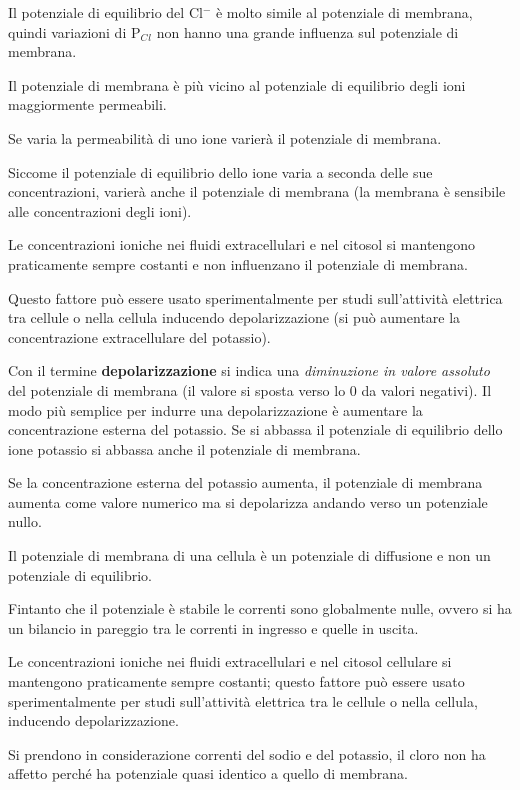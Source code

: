 \documentclass[]{article}
\begin{document}
Il potenziale di equilibrio del Cl\(^-\) è molto simile al potenziale di
membrana, quindi variazioni di P\(_C\)\(_l\) non hanno una grande
influenza sul potenziale di membrana.

Il potenziale di membrana è più vicino al potenziale di equilibrio degli
ioni maggiormente permeabili.

Se varia la permeabilità di uno ione varierà il potenziale di membrana.

Siccome il potenziale di equilibrio dello ione varia a seconda delle sue
concentrazioni, varierà anche il potenziale di membrana (la membrana è
sensibile alle concentrazioni degli ioni).

Le concentrazioni ioniche nei fluidi extracellulari e nel citosol si
mantengono praticamente sempre costanti e non influenzano il potenziale
di membrana.

Questo fattore può essere usato sperimentalmente per studi sull'attività
elettrica tra cellule o nella cellula inducendo depolarizzazione (si può
aumentare la concentrazione extracellulare del potassio).

Con il termine \textbf{depolarizzazione} si indica una \emph{diminuzione
in valore assoluto} del potenziale di membrana (il valore si sposta
verso lo 0 da valori negativi). Il modo più semplice per indurre una
depolarizzazione è aumentare la concentrazione esterna del potassio. Se
si abbassa il potenziale di equilibrio dello ione potassio si abbassa
anche il potenziale di membrana.

Se la concentrazione esterna del potassio aumenta, il potenziale di
membrana aumenta come valore numerico ma si depolarizza andando verso un
potenziale nullo.

Il potenziale di membrana di una cellula è un potenziale di diffusione e
non un potenziale di equilibrio.

Fintanto che il potenziale è stabile le correnti sono globalmente nulle,
ovvero si ha un bilancio in pareggio tra le correnti in ingresso e
quelle in uscita.

Le concentrazioni ioniche nei fluidi extracellulari e nel citosol
cellulare si mantengono praticamente sempre costanti; questo fattore può
essere usato sperimentalmente per studi sull'attività elettrica tra le
cellule o nella cellula, inducendo depolarizzazione.

Si prendono in considerazione correnti del sodio e del potassio, il
cloro non ha affetto perché ha potenziale quasi identico a quello di
membrana.
\end{document}
